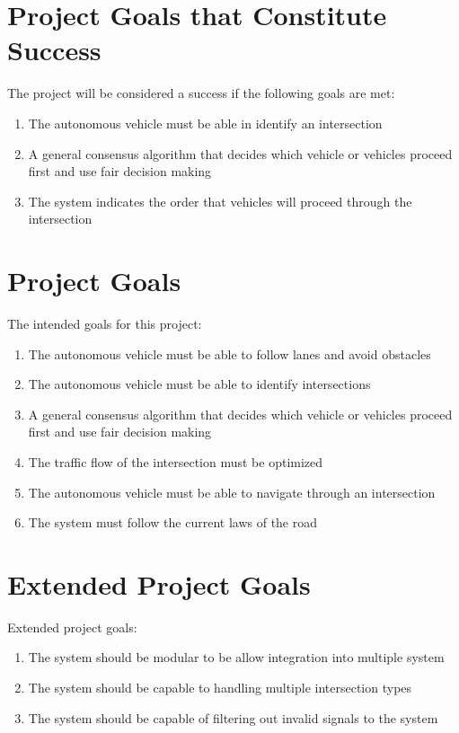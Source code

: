 \documentclass [12pt]{article}
\begin{document}
\section{Project Goals that Constitute Success }
The project will be considered a success if the following goals are met:
\begin{enumerate}
	\setlength\itemsep{-0.3em}
	\item The autonomous vehicle must be able in identify an intersection 
	\item A general consensus algorithm that decides which vehicle or vehicles proceed first and use fair decision making
	\item The system indicates the order that vehicles will proceed through the intersection
\end{enumerate}

\section{Project Goals}
The intended goals for this project: 
\begin{enumerate}
	\setlength\itemsep{-0.3em}
	\item The autonomous vehicle must be able to follow lanes and avoid obstacles
	\item The autonomous vehicle must be able to identify intersections 
	\item A general consensus algorithm that decides which vehicle or vehicles proceed first and use fair decision making
	\item The traffic flow of the intersection must be optimized
	\item The autonomous vehicle must be able to navigate through an intersection
	\item The system must follow the current laws of the road 
\end{enumerate}

\section{Extended Project Goals}
Extended project goals:
\begin{enumerate}
	\setlength\itemsep{-0.3em}
	\item The system should be modular to be allow integration into multiple system
	\item The system should be capable to handling multiple intersection types
	\item The system should be capable of filtering out invalid signals to the system
\end{enumerate}
\end{document}
